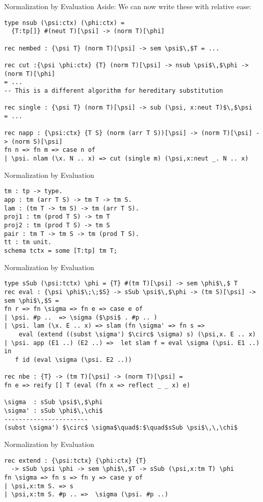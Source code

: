 \documentclass{beamer}
\begin{document}
\begin{frame}[fragile]{Normalization by Evaluation}
Aside: We can now write these with relative ease:
\begin{lstlisting}
type nsub (\psi:ctx) (\phi:ctx) =
  {T:tp[]} #(neut T)[\psi] -> (norm T)[\phi]

rec nembed : {\psi T} (norm T)[\psi] -> sem \psi$\,$T = ...

rec cut :{\psi \phi:ctx} {T} (norm T)[\psi] -> nsub \psi$\,$\phi -> (norm T)[\phi]
= ...
-- This is a different algorithm for hereditary substitution

rec single : {\psi T} (norm T)[\psi] -> sub (\psi, x:neut T)$\,$\psi
= ...

rec napp : {\psi:ctx} {T S} (norm (arr T S))[\psi] -> (norm T)[\psi] -> (norm S)[\psi]
fn n => fn m => case n of
| \psi. nlam (\x. N .. x) => cut (single m) (\psi,x:neut _. N .. x)
\end{lstlisting}
\end{frame}

\begin{frame}[fragile]{Normalization by Evaluation}
\begin{lstlisting}
tm : tp -> type.
app : tm (arr T S) -> tm T -> tm S.
lam : (tm T -> tm S) -> tm (arr T S).
proj1 : tm (prod T S) -> tm T
proj2 : tm (prod T S) -> tm S
pair : tm T -> tm S -> tm (prod T S).
tt : tm unit.
schema tctx = some [T:tp] tm T;
\end{lstlisting}
\end{frame}

\begin{frame}[fragile]{Normalization by Evaluation}
\begin{lstlisting}
type sSub (\psi:tctx) \phi = {T} #(tm T)[\psi] -> sem \phi$\,$ T
rec eval : {\psi \phi$\;\;$S} -> sSub \psi$\,$\phi -> (tm S)[\psi] -> sem \phi$\,$S =
fn r => fn \sigma => fn e => case e of 
| \psi. #p ..  => \sigma ($\psi$ . #p .. )
| \psi. lam (\x. E .. x) => slam (fn \sigma' => fn s =>
    eval (extend ((subst \sigma') $\circ$ \sigma) s) (\psi,x. E .. x)
| \psi. app (E1 ..) (E2 ..) =>  let slam f = eval \sigma (\psi. E1 ..) in
   f id (eval \sigma (\psi. E2 ..))

rec nbe : {T} -> (tm T)[\psi] -> (norm T)[\psi] = 
fn e => reify [] T (eval (fn x => reflect _ _ x) e)

\sigma  : sSub \psi$\,$\phi
\sigma' : sSub \phi$\,\chi$
-----------------------
(subst \sigma') $\circ$ \sigma$\quad$:$\quad$sSub \psi$\,\,\chi$
\end{lstlisting}
\end{frame}

\begin{frame}[fragile]{Normalization by Evaluation}
\begin{lstlisting}
rec extend : {\psi:tctx} {\phi:ctx} {T}
  -> sSub \psi \phi -> sem \phi$\,$T -> sSub (\psi,x:tm T) \phi
fn \sigma => fn s => fn y => case y of
| \psi,x:tm S. => s
| \psi,x:tm S. #p .. =>  \sigma (\psi. #p ..)
\end{lstlisting}
\end{frame}
\end{document}
